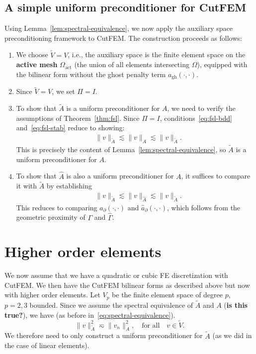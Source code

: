 \documentclass[11pt]{article}
\theoremstyle{remark}
\begin{document}
\subsection{A simple uniform preconditioner for CutFEM}
Using Lemma~\ref{lem:spectral-equivalence}, we now apply the auxiliary space preconditioning framework to CutFEM. The construction proceeds as follows:
\begin{enumerate}
  \item We choose $\widetilde{V}=V$, i.e., the auxiliary space is the finite element space on the {\bf active mesh} $\Omega_\text{act}$ (the union of all elements intersecting $\Omega$), equipped with the bilinear form without the ghost penalty term $a_{\text{gh}}(\cdot,\cdot)$.
  \item Since $\widetilde{V}=V$, we set $\Pi=I$.
  \item To show that $\widetilde{A}$ is a uniform preconditioner for $A$, we need to verify the assumptions of Theorem~\ref{thm:fsl}.
  Since $\Pi=I$, conditions~\eqref{eq:fsl-bdd} and~\eqref{eq:fsl-stab} reduce to showing:
  \begin{equation}\label{eq:fls-bdd-stable-tilde}
    \begin{aligned}
     &\|v\|_{\widetilde{A}} \lesssim\|v\|_{A}\lesssim\|v\|_{\widetilde{A}}.
    \end{aligned}
  \end{equation} 
  This is precisely the content of Lemma~\ref{lem:spectral-equivalence}, so $\widetilde{A}$ is a uniform preconditioner for $A$.
  \item To show that $\widehat{A}$ is also a uniform preconditioner for $A$, it suffices to compare it with $\widetilde{A}$ by establishing
  \begin{equation}\label{eq:fls-bdd-stable-hat}
    \begin{aligned}
&     \|v\|_{\widetilde{A}} \lesssim\|v\|_{\widehat{A}}\lesssim \|v\|_{\widetilde{A}}.
    \end{aligned}
  \end{equation} 
  This reduces to comparing $a_\partial(\cdot,\cdot)$ and $\widehat{a}_\partial(\cdot,\cdot)$, which follows from the geometric proximity of $\Gamma$ and $\widehat{\Gamma}$.
\end{enumerate}

\section{Higher order elements}
We now assume that we have a quadratic or cubic FE discretization with CutFEM. We then have the CutFEM bilinear forms as described above but now with higher order elements. Let $V_p$ be the finite element space of degree $p$, $p=2,3$ bounded. 
 Since we assume the spectral equivalence of $\widetilde{A}$ and $A$ ({\bf is this true?}), we have (as before in~\eqref{eq:spectral-equivalence}).
\begin{equation}
  \|v\|_{\widetilde{A}}^2 \eqsim \|v_n\|_{A}^2, 
  \quad \mbox{for all}\quad v \in \widetilde{V}.
\end{equation}
We therefore need to only construct a uniform preconditioner for $\widetilde{A}$ (as we did in the case of linear elements).
\end{document}
